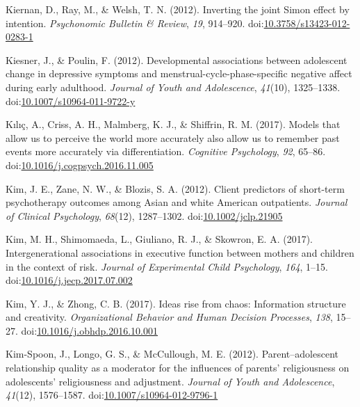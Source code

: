 \documentclass[english,man]{apa6}
\begin{document}
\hypertarget{ref-Kiernan2012}{}
Kiernan, D., Ray, M., \& Welsh, T. N. (2012). Inverting the joint Simon
effect by intention. \emph{Psychonomic Bulletin \& Review}, \emph{19},
914--920.
doi:\href{https://doi.org/10.3758/s13423-012-0283-1}{10.3758/s13423-012-0283-1}

\hypertarget{ref-Kiesner2012}{}
Kiesner, J., \& Poulin, F. (2012). Developmental associations between
adolescent change in depressive symptoms and
menstrual-cycle-phase-specific negative affect during early adulthood.
\emph{Journal of Youth and Adolescence}, \emph{41}(10), 1325--1338.
doi:\href{https://doi.org/10.1007/s10964-011-9722-y}{10.1007/s10964-011-9722-y}

\hypertarget{ref-Klc2017}{}
Kılıç, A., Criss, A. H., Malmberg, K. J., \& Shiffrin, R. M. (2017).
Models that allow us to perceive the world more accurately also allow us
to remember past events more accurately via differentiation.
\emph{Cognitive Psychology}, \emph{92}, 65--86.
doi:\href{https://doi.org/10.1016/j.cogpsych.2016.11.005}{10.1016/j.cogpsych.2016.11.005}

\hypertarget{ref-Kim2012}{}
Kim, J. E., Zane, N. W., \& Blozis, S. A. (2012). Client predictors of
short-term psychotherapy outcomes among Asian and white American
outpatients. \emph{Journal of Clinical Psychology}, \emph{68}(12),
1287--1302.
doi:\href{https://doi.org/10.1002/jclp.21905}{10.1002/jclp.21905}

\hypertarget{ref-Kim2017}{}
Kim, M. H., Shimomaeda, L., Giuliano, R. J., \& Skowron, E. A. (2017).
Intergenerational associations in executive function between mothers and
children in the context of risk. \emph{Journal of Experimental Child
Psychology}, \emph{164}, 1--15.
doi:\href{https://doi.org/10.1016/j.jecp.2017.07.002}{10.1016/j.jecp.2017.07.002}

\hypertarget{ref-Kim2017a}{}
Kim, Y. J., \& Zhong, C. B. (2017). Ideas rise from chaos: Information
structure and creativity. \emph{Organizational Behavior and Human
Decision Processes}, \emph{138}, 15--27.
doi:\href{https://doi.org/10.1016/j.obhdp.2016.10.001}{10.1016/j.obhdp.2016.10.001}

\hypertarget{ref-Kim-Spoon2012}{}
Kim-Spoon, J., Longo, G. S., \& McCullough, M. E. (2012).
Parent--adolescent relationship quality as a moderator for the
influences of parents' religiousness on adolescents' religiousness and
adjustment. \emph{Journal of Youth and Adolescence}, \emph{41}(12),
1576--1587.
doi:\href{https://doi.org/10.1007/s10964-012-9796-1}{10.1007/s10964-012-9796-1}
\end{document}
